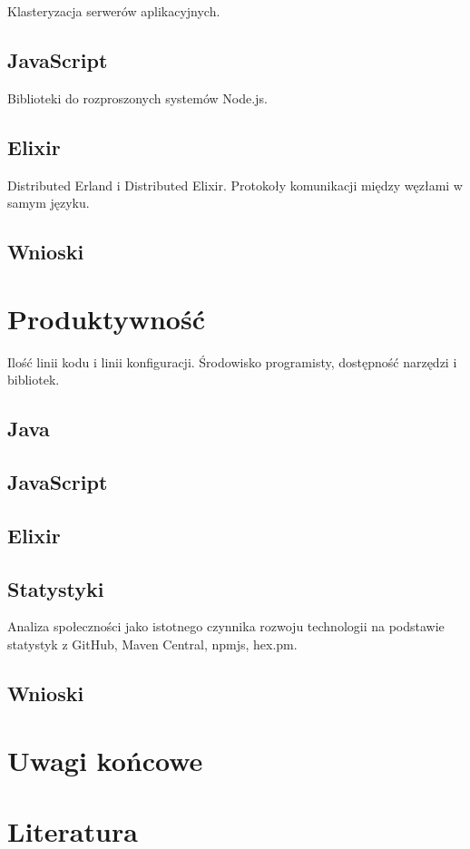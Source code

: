 Klasteryzacja serwerów aplikacyjnych.

\subsection{JavaScript}\label{javascript-2}

Biblioteki do rozproszonych systemów Node.js.

\subsection{Elixir}\label{elixir-2}

Distributed Erland i Distributed Elixir. Protokoły komunikacji między
węzłami w samym języku.

\subsection{Wnioski}\label{wnioski-1}

\section{Produktywność}\label{produktywnoux15bux107}

Ilość linii kodu i linii konfiguracji. Środowisko programisty,
dostępność narzędzi i bibliotek.

\subsection{Java}\label{java-3}

\subsection{JavaScript}\label{javascript-3}

\subsection{Elixir}\label{elixir-3}

\subsection{Statystyki}\label{statystyki}

Analiza społeczności jako istotnego czynnika rozwoju technologii na
podstawie statystyk z GitHub, Maven Central, npmjs, hex.pm.

\subsection{Wnioski}\label{wnioski-2}

\section{Uwagi końcowe}\label{uwagi-koux144cowe}

\section{Literatura}\label{literatura}

